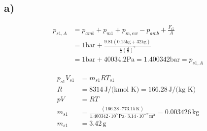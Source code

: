 

\subsection*{a)}
\begin{align*}
p_{s1, A} &= p_{amb} + p_{m1} + p_{m, ew} - p_{amb} + \frac{F_G}{A} \\
&= 1 \text{bar} + \frac{9.81 (0.15 \text{kg} + 32 \text{kg})}{\frac{\pi}{4} \left( \frac{d}{2} \right)^2} \\
&= 1 \text{bar} + 40034.2 \text{Pa} = 1.400342 \text{bar} = p_{s1, A}
\end{align*}

\begin{align*}
p_{s1} V_{s1} &= m_{s1} R T_{s1} \\
R &= 8314 \, \text{J/(kmol K)} = 166.28 \, \text{J/(kg K)} \\
p V &= R T \\
m_{s1} &= \frac{(166.28 \cdot 773.15 \, \text{K})}{1.400342 \cdot 10^5 \, \text{Pa} \cdot 3.14 \cdot 10^{-2} \, \text{m}^3} = 0.003426 \, \text{kg} \\
m_{s1} &= 3.42 \, \text{g}
\end{align*}